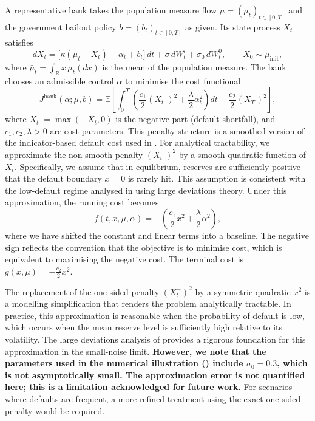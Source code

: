 A representative bank takes the population measure flow $\mu = (\mu_t)_{t \in [0,T]}$
and the government bailout policy $b = (b_t)_{t \in [0,T]}$ as given. Its state
process $X_t$ satisfies
\begin{equation}
    dX_t = \big[ \kappa(\bar\mu_t - X_t) + \alpha_t + b_t \big]\, dt + \sigma\,
    dW_t^i + \sigma_0\, dW_t^0, \qquad X_0 \sim \mu_{\mathrm{init}},
    \label{eq:sr-bank-sde}
\end{equation}
where $\bar\mu_t = \int_{\mathbb{R}} x\, \mu_t(dx)$ is the mean of the population
measure. The bank chooses an admissible control $\alpha$ to minimise the cost
functional
\[
    J^{\mathrm{bank}}(\alpha; \mu, b) = \mathbb{E}\left[ \int_0^T \left(
    \frac{c_1}{2}(X_t^-)^2 + \frac{\lambda}{2}\alpha_t^2 \right) dt +
    \frac{c_2}{2}(X_T^-)^2 \right],
\]
where $X_t^- = \max(-X_t, 0)$ is the negative part (default shortfall), and
$c_1, c_2, \lambda > 0$ are cost parameters. This penalty structure is a smoothed
version of the indicator-based default cost used in \citep{carmonafouquesun2015}.
For analytical tractability, we approximate the non-smooth penalty $(X_t^-)^2$ by a
smooth quadratic function of $X_t$. Specifically, we assume that in equilibrium,
reserves are sufficiently positive that the default boundary $x=0$ is rarely hit.
This assumption is consistent with the low-default regime analysed in \citep{garnierpapanicolaouyang2013} using large deviations theory. Under this
approximation, the running cost becomes
\begin{equation}
    f(t,x,\mu,\alpha) = -\left( \frac{c_1}{2} x^2 + \frac{\lambda}{2}\alpha^2
    \right),
    \label{eq:sr-running-cost}
\end{equation}
where we have shifted the constant and linear terms into a baseline. The negative
sign reflects the convention that the objective is to minimise cost, which is
equivalent to maximising the negative cost. The terminal cost is
$g(x,\mu) = -\tfrac{c_2}{2}x^2$.

\begin{remark}
The replacement of the one-sided penalty $(X_t^-)^2$ by a symmetric quadratic $x^2$
is a modelling simplification that renders the problem analytically tractable. In
practice, this approximation is reasonable when the probability of default is low,
which occurs when the mean reserve level is sufficiently high relative to its
volatility. The large deviations analysis of \citep{garnierpapanicolaouyang2013}
provides a rigorous foundation for this approximation in the small-noise limit.
\textbf{However, we note that the parameters used in the numerical illustration
() include $\sigma_0 = 0.3$, which is not asymptotically
small. The approximation error is not quantified here; this is a limitation
acknowledged for future work.} For scenarios where defaults are frequent, a more
refined treatment using the exact one-sided penalty would be required.
\end{remark}


